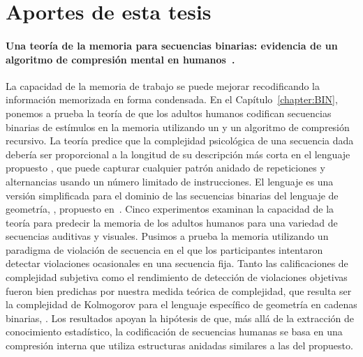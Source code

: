 \section{Aportes de esta tesis}

\paragraph{Una teoría de la memoria para secuencias binarias: evidencia de un algoritmo de compresión mental en humanos~\cite{planton2021memory}.} 
La capacidad de la memoria de trabajo se puede mejorar recodificando la información memorizada en forma condensada. En el Capítulo~\ref{chapter:BIN}, ponemos a prueba la teoría de que los adultos humanos codifican secuencias binarias de estímulos en la memoria utilizando un \lot y un algoritmo de compresión recursivo. La teoría predice que la complejidad psicológica de una secuencia dada debería ser proporcional a la longitud de su descripción más corta en el lenguaje propuesto \grambin, que puede capturar cualquier patrón anidado de repeticiones y alternancias usando un número limitado de instrucciones. El lenguaje \grambin es una versión simplificada para el dominio de las secuencias binarias del lenguaje de geometría, \gramgeo, propuesto en~\cite{amalric2017language}. Cinco experimentos examinan la capacidad de la teoría para predecir la memoria de los adultos humanos para una variedad de secuencias auditivas y visuales. Pusimos a prueba la memoria utilizando un paradigma de violación de secuencia en el que los participantes intentaron detectar violaciones ocasionales en una secuencia fija. Tanto las calificaciones de complejidad subjetiva como el rendimiento de detección de violaciones objetivas fueron bien predichas por nuestra medida teórica de complejidad, que resulta ser la complejidad de Kolmogorov para el lenguaje específico de geometría en cadenas binarias, \grambin. Los resultados apoyan la hipótesis de que, más allá de la extracción de conocimiento estadístico, la codificación de secuencias humanas se basa en una compresión interna que utiliza estructuras anidadas similares a las del \lot propuesto.


